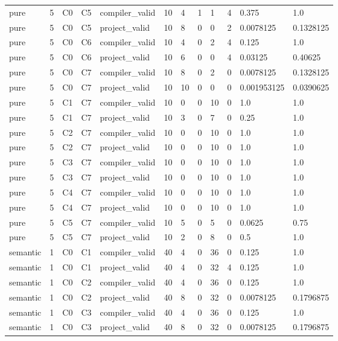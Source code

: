 \begin{tabular}{llllllllllll}
pure & 5 & C0 & C5 & compiler\_valid & 10 & 4 & 1 & 1 & 4 & 0.375 & 1.0 \\
pure & 5 & C0 & C5 & project\_valid & 10 & 8 & 0 & 0 & 2 & 0.0078125 & 0.1328125 \\
pure & 5 & C0 & C6 & compiler\_valid & 10 & 4 & 0 & 2 & 4 & 0.125 & 1.0 \\
pure & 5 & C0 & C6 & project\_valid & 10 & 6 & 0 & 0 & 4 & 0.03125 & 0.40625 \\
pure & 5 & C0 & C7 & compiler\_valid & 10 & 8 & 0 & 2 & 0 & 0.0078125 & 0.1328125 \\
pure & 5 & C0 & C7 & project\_valid & 10 & 10 & 0 & 0 & 0 & 0.001953125 & 0.0390625 \\
pure & 5 & C1 & C7 & compiler\_valid & 10 & 0 & 0 & 10 & 0 & 1.0 & 1.0 \\
pure & 5 & C1 & C7 & project\_valid & 10 & 3 & 0 & 7 & 0 & 0.25 & 1.0 \\
pure & 5 & C2 & C7 & compiler\_valid & 10 & 0 & 0 & 10 & 0 & 1.0 & 1.0 \\
pure & 5 & C2 & C7 & project\_valid & 10 & 0 & 0 & 10 & 0 & 1.0 & 1.0 \\
pure & 5 & C3 & C7 & compiler\_valid & 10 & 0 & 0 & 10 & 0 & 1.0 & 1.0 \\
pure & 5 & C3 & C7 & project\_valid & 10 & 0 & 0 & 10 & 0 & 1.0 & 1.0 \\
pure & 5 & C4 & C7 & compiler\_valid & 10 & 0 & 0 & 10 & 0 & 1.0 & 1.0 \\
pure & 5 & C4 & C7 & project\_valid & 10 & 0 & 0 & 10 & 0 & 1.0 & 1.0 \\
pure & 5 & C5 & C7 & compiler\_valid & 10 & 5 & 0 & 5 & 0 & 0.0625 & 0.75 \\
pure & 5 & C5 & C7 & project\_valid & 10 & 2 & 0 & 8 & 0 & 0.5 & 1.0 \\
semantic & 1 & C0 & C1 & compiler\_valid & 40 & 4 & 0 & 36 & 0 & 0.125 & 1.0 \\
semantic & 1 & C0 & C1 & project\_valid & 40 & 4 & 0 & 32 & 4 & 0.125 & 1.0 \\
semantic & 1 & C0 & C2 & compiler\_valid & 40 & 4 & 0 & 36 & 0 & 0.125 & 1.0 \\
semantic & 1 & C0 & C2 & project\_valid & 40 & 8 & 0 & 32 & 0 & 0.0078125 & 0.1796875 \\
semantic & 1 & C0 & C3 & compiler\_valid & 40 & 4 & 0 & 36 & 0 & 0.125 & 1.0 \\
semantic & 1 & C0 & C3 & project\_valid & 40 & 8 & 0 & 32 & 0 & 0.0078125 & 0.1796875 \\

\end{tabular}
